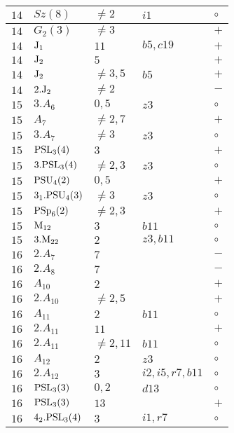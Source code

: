 \documentclass[a4paper, 11pt]{article}
\begin{document}
\begin{longtable}{lllll}
		$14$ & $Sz(8)$ & $\neq 2$ & $i1$ & $\circ$ \\ \hline
		$14$ & $G_{2}(3)$ & $\neq 3$ & & $+$ \\ \hline
		$14$ & ${\rm J}_1$ & $11$ & $b5, c19$ & $+$ \\ \hline
		$14$ & ${\rm J}_2$ & $5$ & & $+$ \\ \hline
		$14$ & ${\rm J}_2$ & $\neq 3,5$ & $b5$ & $+$ \\ \hline
		$14$ & $2.{\rm J}_2$ & $\neq 2$ & & $-$ \\ \hline
		$15$ & $3.A_{6}$ & $0,5$ & $z3$ & $\circ$ \\ \hline
		$15$ & $A_{7}$ & $\neq 2,7$ & & $+$ \\ \hline
		$15$ & $3.A_{7}$ & $\neq 3$ & $z3$ & $\circ$ \\ \hline
		$15$ & ${\rm PSL}_{3}(4)$ & $3$ & & $+$ \\ \hline
		$15$ & $3.{\rm PSL}_{3}(4)$ & $\neq 2,3$ & $z3$ & $\circ$ \\ \hline
		$15$ & ${\rm PSU}_{4}(2)$ & $0,5$ & & $+$ \\ \hline
		$15$ & $3_1.{\rm PSU}_{4}(3)$ & $\neq 3$ & $z3$ & $\circ$ \\ \hline
		$15$ & ${\rm PSp}_{6}(2)$ & $\neq 2,3$ & & $+$ \\ \hline
		$15$ & ${\rm M}_{12}$ & $3$ & $b11$ & $\circ$ \\ \hline
		$15$ & $3.{\rm M}_{22}$ & $2$ & $z3, b11$ & $\circ$ \\ \hline
		$16$ & $2.A_{7}$ & $7$ & & $-$ \\ \hline
		$16$ & $2.A_{8}$ & $7$ & & $-$ \\ \hline
		$16$ & $A_{10}$ & $2$ & & $+$ \\ \hline
		$16$ & $2.A_{10}$ & $\neq 2,5$ & & $+$ \\ \hline
		$16$ & $A_{11}$ & $2$ & $b11$ & $\circ$ \\ \hline
		$16$ & $2.A_{11}$ & $11$ & & $+$ \\ \hline
		$16$ & $2.A_{11}$ & $\neq 2,11$ & $b11$ & $\circ$ \\ \hline
		$16$ & $A_{12}$ & $2$ & $z3$ & $\circ$ \\ \hline
		$16$ & $2.A_{12}$ & $3$ & $i2, i5, r7, b11$ & $\circ$ \\ \hline
		$16$ & ${\rm PSL}_{3}(3)$ & $0,2$ & $d13$ & $\circ$ \\ \hline
		$16$ & ${\rm PSL}_{3}(3)$ & $13$ & & $+$ \\ \hline
		$16$ & $4_2.{\rm PSL}_{3}(4)$ & $3$ & $i1, r7$ & $\circ$ \\ \hline

\end{longtable}
\end{document}
